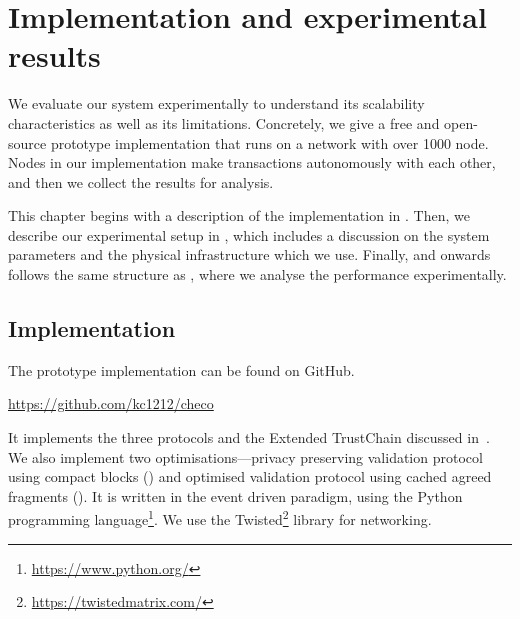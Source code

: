 \chapter{Implementation and experimental results}
\label{ch:implementation}

We evaluate our system experimentally to understand its scalability characteristics as well as its limitations.
Concretely,
we give a free and open-source prototype implementation that runs on a network with over 1000 node.
Nodes in our implementation make transactions autonomously with each other, and then we collect the results for analysis.

This chapter begins with a description of the implementation in .
Then, we describe our experimental setup in ,
which includes a discussion on the system parameters and the physical infrastructure which we use.
Finally,  and onwards follows the same structure as ,
where we analyse the performance experimentally.


\section{Implementation}
\label{sec:implementation}

The prototype implementation can be found on GitHub.
\begin{displayquote}
\url{https://github.com/kc1212/checo}
\end{displayquote}
It implements the three protocols and the Extended TrustChain discussed in~.
We also implement two optimisations---privacy preserving validation protocol using compact blocks ()
and optimised validation protocol using cached agreed fragments ().
It is written in the event driven paradigm, using the Python programming language\footnote{\url{https://www.python.org/}}.
We use the Twisted\footnote{\url{https://twistedmatrix.com/}} library for networking.

